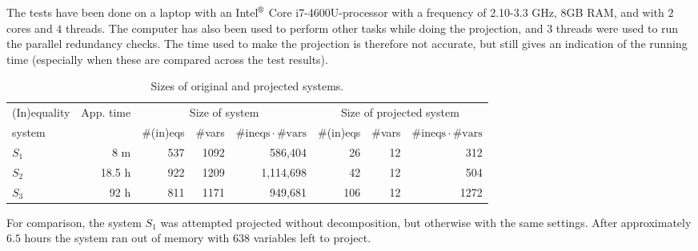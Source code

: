 The tests have been done on a laptop with an Intel$^\text{\textregistered}$ Core\texttrademark\; i7-4600U-processor with a frequency of 2.10-3.3 GHz, 8GB RAM, and with $2$ cores and $4$ threads. The computer has also been used to perform other tasks while doing the projection, and $3$ threads were used to run the parallel redundancy checks. The time used to make the projection is therefore not accurate, but still gives an indication of the running time (especially when these are compared across the test results).

\begin{table}[H]
\centering
\noindent\begin{tabular}{|l|r|r|r|r|r|r|r|}
\hline
(In)equality&App. time&\multicolumn{3}{c|}{Size of system}&\multicolumn{3}{c|}{Size of projected system}\\
system&&{\#(in)eqs}&{\#vars}&${\#\text{ineqs}\cdot\#\text{vars}}$&{\#(in)eqs}&{\#vars}&${\#\text{ineqs}\cdot\#\text{vars}}$\\
\hline
$S_1$&8 m&537&1092&586,404&26&12&312\\
$S_2$&18.5 h&922&1209&1,114,698&42&12&504\\
$S_3$&92 h&811&1171&949,681&106&12&1272\\
\hline
\end{tabular}
\caption{Sizes of original and projected systems.}\label{tab:results}
\end{table}

For comparison, the system $S_1$ was attempted projected without decomposition, but otherwise with the same settings. After approximately $6.5$ hours the system ran out of memory with $638$ variables left to project.

